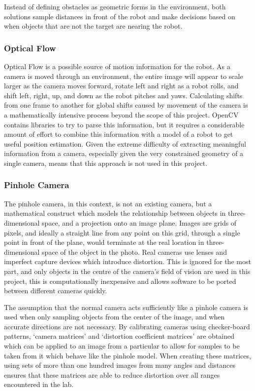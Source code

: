 \documentclass{article}[12]
\begin{document}
		Instead of defining obstacles as geometric forms in the environment, both solutions sample distances in front of the robot and make decisions based on when objects that are not the target are nearing the robot.
		
		\subsubsection{Optical Flow}
		
		Optical Flow is a possible source of motion information for the robot. As a camera is moved through an environment, the entire image will appear to scale larger as the camera moves forward, rotate left and right as a robot rolls, and shift left, right, up, and down as the robot pitches and yaws. Calculating shifts from one frame to another for global shifts caused by movement of the camera is a mathematically intensive process beyond the scope of this project. OpenCV contains libraries to try to parse this information, but it requires a considerable amount of effort to combine this information with a model of a robot to get useful position estimation. Given the extreme difficulty of extracting meaningful information from a camera, especially given the very constrained geometry of a single camera, means that this approach is not used in this project.
		
		\subsubsection{Pinhole Camera}
		
		The pinhole camera, in this context, is not an existing camera, but a mathematical construct which models the relationship between objects in three-dimensional space, and a projection onto an image plane. Images are grids of pixels, and ideally a straight line from any point on this grid, through a single point in front of the plane, would terminate at the real location in three-dimensional space of the object in the photo. Real cameras use lenses and imperfect capture devices which introduce distortion. This is ignored for the most part, and only objects in the centre of the camera's field of vision are used in this project, this is computationally inexpensive and allows software to be ported between different cameras quickly.
		
		The assumption that the normal camera acts sufficiently like a pinhole camera is used when only sampling objects from the center of the image, and when accurate directions are not necessary. By calibrating cameras using checker-board patterns, `camera matrices' and `distortion coefficient matrices' are obtained which can be applied to an image from a particular to allow for samples to be taken from it which behave like the pinhole model. When creating these matrices, using sets of more than one hundred images from many angles and distances ensures that these matrices are able to reduce distortion over all ranges encountered in the lab.
		
\end{document}

